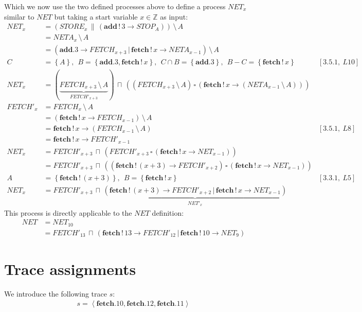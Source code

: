 \documentclass[11pt,a4paper]{article}
\def\ra{\rightarrow}
\def\cc{\,\|\,}
\def\gc{\,\square\,}
\def\ch{\,|\,}
\def\ic{\,\sqcap\,}
\def\hide{\,\setminus\,}
\def\wr{\,!\,}
\newcommand{\chan}[1]{\textbf{#1}}
\newcommand{\ab}[1]{\left \langle #1 \right \rangle}
\newcommand{\sN}[1]{\left \lbrace #1 \right \rbrace}
\begin{document}
Which we now use the two defined processes above to define a process $NET_x$
similar to $NET$ but taking a start variable $x \in \mathbb{Z}$ as input:
\begin{align*}
    NET_x &=(STORE_x \cc (\chan{add} \wr 3 \ra STOP_A)) \hide A \\
        &= NETA_x \hide A \\
        &= (\chan{add}.3 \ra FETCH_{x+3} \ch \chan{fetch}\wr x \ra NETA_{x-1})
        \hide A \\
        C &= \sN{A},~~ B = \sN{\chan{add}.3, \chan{fetch}\wr x},~~
        C \cap B = \sN{\chan{add}.3},~~B - C = \sN{\chan{fetch}\wr x}
            & [3.5.1,~L10] \\
    NET_x &= (\underbrace{FETCH_{x+3} \hide A}_{FETCH'_{x+3}}) \ic
            ((FETCH_{x+3} \hide A) \gc
            (\chan{fetch}\wr x \ra (NETA_{x-1} \hide A)
            )) & \\
    FETCH'_{x} &= FETCH_x \hide A \\
               &= (\chan{fetch}\wr x \ra FETCH_{x-1}) \hide A \\
               &= \chan{fetch} \wr x \ra (FETCH_{x-1} \hide A) & [3.5.1,~L8] \\
               &= \chan{fetch} \wr x \ra FETCH'_{x-1} \\
    NET_x &= FETCH'_{x+3} \ic
             (FETCH'_{x+3} \gc
              (\chan{fetch}\wr x \ra NET_{x-1}
             )) & \\
          &= FETCH'_{x+3} \ic
             ((\chan{fetch} \wr (x+3) \ra FETCH'_{x+2}) \gc
              (\chan{fetch}\wr x \ra NET_{x-1}
             )) & \\
    A &= \sN{\chan{fetch} \wr (x+3)},~~ B = \sN{\chan{fetch} \wr x} &
            [3.3.1,~L5] \\
    NET_x &= FETCH'_{x+3} \ic
             \underbrace{(\chan{fetch} \wr (x+3) \ra FETCH'_{x+2} \ch
             \chan{fetch} \wr x \ra NET_{x-1})}_{NET'_x}
\end{align*}
This process is directly applicable to the $NET$ definition:
\begin{align*}
    NET &= NET_{10} \\
        &= FETCH'_{13} \ic (\chan{fetch}\wr 13 \ra FETCH'_{12} \ch
            \chan{fetch}\wr 10 \ra NET_{9})
\end{align*}


\section{Trace assignments}
We introduce the following trace $s$:
\begin{align*}
    s = \ab{ \chan{fetch}.10, \chan{fetch}.12, \chan{fetch}.11}
\end{align*}
\end{document}
